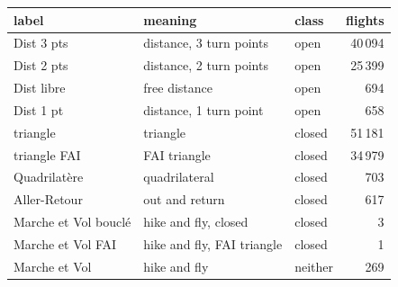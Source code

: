 \begin{tabular}{@{}l l l r@{}}
\toprule
label & meaning & class & flights \\
\midrule
Dist 3 pts & distance, 3 turn points & open & 40\,094 \\
Dist 2 pts & distance, 2 turn points & open & 25\,399 \\
Dist libre & free distance & open & 694 \\
Dist 1 pt & distance, 1 turn point & open & 658 \\
triangle & triangle & closed & 51\,181 \\
triangle FAI & FAI triangle & closed & 34\,979 \\
Quadrilatère & quadrilateral & closed & 703 \\
Aller-Retour & out and return & closed & 617 \\
Marche et Vol bouclé & hike and fly, closed & closed & 3 \\
Marche et Vol FAI & hike and fly, FAI triangle & closed & 1 \\
Marche et Vol & hike and fly & neither & 269 \\
\bottomrule
\end{tabular}
